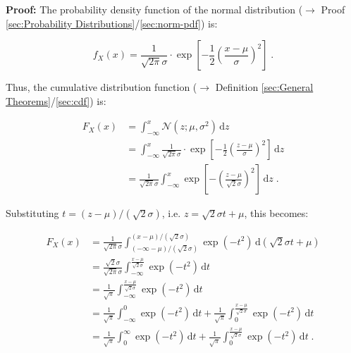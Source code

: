 \documentclass[a4paper,12pt,twoside]{book}
\begin{document}
\vspace{1em}
\textbf{Proof:} The probability density function of the normal distribution ($\rightarrow$ Proof \ref{sec:Probability Distributions}/\ref{sec:norm-pdf}) is:

\begin{equation} \label{eq:norm-cdf-norm-pdf}
f_X(x) = \frac{1}{\sqrt{2 \pi} \sigma} \cdot \exp \left[ -\frac{1}{2} \left( \frac{x-\mu}{\sigma} \right)^2 \right] \; .
\end{equation}

Thus, the cumulative distribution function ($\rightarrow$ Definition \ref{sec:General Theorems}/\ref{sec:cdf}) is:

\begin{equation} \label{eq:norm-cdf-norm-cdf-s1}
\begin{split}
F_X(x) &= \int_{-\infty}^{x} \mathcal{N}(z; \mu, \sigma^2) \, \mathrm{d}z \\
&= \int_{-\infty}^{x} \frac{1}{\sqrt{2 \pi} \sigma} \cdot \exp \left[ -\frac{1}{2} \left( \frac{z-\mu}{\sigma} \right)^2 \right] \, \mathrm{d}z \\
&= \frac{1}{\sqrt{2 \pi} \sigma} \int_{-\infty}^{x} \exp \left[ -\left( \frac{z-\mu}{\sqrt{2} \sigma} \right)^2 \right] \, \mathrm{d}z \; .
\end{split}
\end{equation}

Substituting $t = (z-\mu)/(\sqrt{2} \sigma)$, i.e. $z = \sqrt{2} \sigma t + \mu$, this becomes:

\begin{equation} \label{eq:norm-cdf-norm-cdf-s2}
\begin{split}
F_X(x) &= \frac{1}{\sqrt{2 \pi} \sigma} \int_{(-\infty-\mu)/(\sqrt{2} \sigma)}^{(x-\mu)/(\sqrt{2} \sigma)} \exp(-t^2) \, \mathrm{d}\left( \sqrt{2} \sigma t + \mu \right) \\
&= \frac{\sqrt{2} \sigma}{\sqrt{2 \pi} \sigma} \int_{-\infty}^{\frac{x-\mu}{\sqrt{2} \sigma}} \exp(-t^2) \, \mathrm{d}t \\
&= \frac{1}{\sqrt{\pi}} \int_{-\infty}^{\frac{x-\mu}{\sqrt{2} \sigma}} \exp(-t^2) \, \mathrm{d}t \\
&= \frac{1}{\sqrt{\pi}} \int_{-\infty}^{0} \exp(-t^2) \, \mathrm{d}t + \frac{1}{\sqrt{\pi}} \int_{0}^{\frac{x-\mu}{\sqrt{2} \sigma}} \exp(-t^2) \, \mathrm{d}t \\
&= \frac{1}{\sqrt{\pi}} \int_{0}^{\infty} \exp(-t^2) \, \mathrm{d}t + \frac{1}{\sqrt{\pi}} \int_{0}^{\frac{x-\mu}{\sqrt{2} \sigma}} \exp(-t^2) \, \mathrm{d}t \; .
\end{split}
\end{equation}
\end{document}
